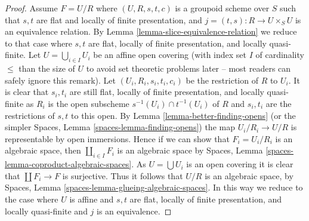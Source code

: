 \begin{proof}
\medskip\noindent
Assume $F = U/R$ where $(U, R, s, t, c)$ is a groupoid scheme
over $S$ such that $s, t$ are flat and locally of finite presentation, and
$j = (t, s) : R \to U \times_S U$ is an equivalence relation. By
Lemma \ref{lemma-slice-equivalence-relation}
we reduce to that case where $s, t$ are flat,
locally of finite presentation, and locally quasi-finite.
Let $U = \bigcup_{i \in I} U_i$ be an affine open covering
(with index set $I$ of cardinality $\leq$ than the size of $U$ to avoid
set theoretic problems later -- most readers can safely ignore this remark).
Let $(U_i, R_i, s_i, t_i, c_i)$ be the restriction of $R$
to $U_i$. It is clear that $s_i, t_i$ are still flat, locally of finite
presentation, and locally quasi-finite as $R_i$ is the open subscheme
$s^{-1}(U_i) \cap t^{-1}(U_i)$ of $R$
and $s_i, t_i$ are the restrictions of $s, t$ to this open. By
Lemma \ref{lemma-better-finding-opens}
(or the simpler
Spaces, Lemma \ref{spaces-lemma-finding-opens})
the map $U_i/R_i \to U/R$ is representable by open immersions.
Hence if we can show that $F_i = U_i/R_i$ is an algebraic space, then
$\coprod_{i \in I} F_i$ is an algebraic space by
Spaces, Lemma \ref{spaces-lemma-coproduct-algebraic-spaces}.
As $U = \bigcup U_i$ is an open covering it is clear that
$\coprod F_i \to F$ is surjective. Thus
it follows that $U/R$ is an algebraic space, by
Spaces, Lemma \ref{spaces-lemma-glueing-algebraic-spaces}.
In this way we reduce to the case where $U$ is affine and $s, t$ are flat,
locally of finite presentation, and locally quasi-finite and
$j$ is an equivalence.


\end{proof}
